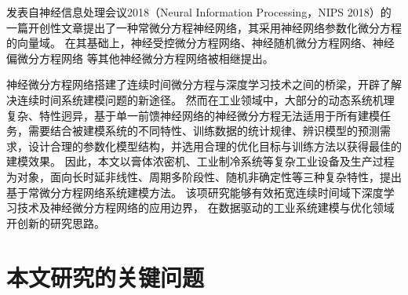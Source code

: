发表自神经信息处理会议2018（Neural Information Processing，NIPS 2018）的一篇开创性文章\cite{chen2018neural}提出了一种常微分方程神经网络，其采用神经网络参数化微分方程的向量域\cite{kidger2021}。
在其基础上，神经受控微分方程网络\cite{kidger2020neural}、神经随机微分方程网络\cite{li2020scalable}、神经偏微分方程网络
\cite{li2020fourier}等其他神经微分方程网络被相继提出。

神经微分方程网络搭建了连续时间微分方程与深度学习技术之间的桥梁，开辟了解决连续时间系统建模问题的新途径。
然而在工业领域中，大部分的动态系统机理复杂、特性迥异，基于单一前馈神经网络的神经微分方程无法适用于所有建模任务，需要结合被建模系统的不同特性、训练数据的统计规律、辨识模型的预测需求，设计合理的参数化模型结构，并选用合理的优化目标与训练方法以获得最佳的建模效果。
因此，本文以膏体浓密机、工业制冷系统等复杂工业设备及生产过程为对象，面向长时延非线性、周期多阶段性、随机非确定性等三种复杂特性，提出基于常微分方程网络系统建模方法。
该项研究能够有效拓宽连续时间域下深度学习技术及神经微分方程网络的应用边界，
在数据驱动的工业系统建模与优化领域开创新的研究思路。
\section{本文研究的关键问题}
\label{sec:challenge}


